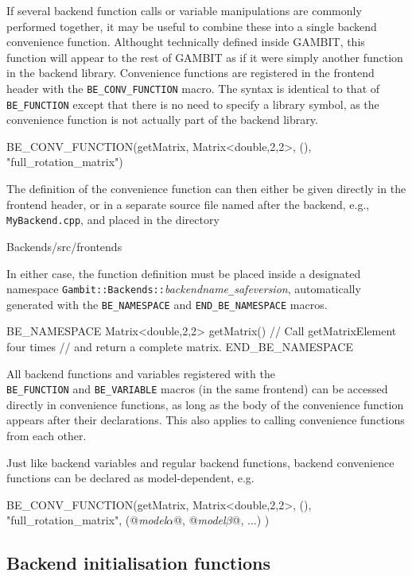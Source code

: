 \documentclass[pdftex,twocolumn,epjc3_preprint,runningheads]{svjour3}
\renewcommand{\_}{\discretionary{\underscore}{}{\underscore}}
\newcommand\cpp[1]{{\lstinline!#1!}}  %
\newcommand\term[1]{{\lstset{style=terminal}\lstinline!#1!\lstset{style=cpp}}}
\newcommand{\metavarf}[1]{\textit{\color{darkgreen}\footnotesize\textrm{#1}}}
\newcommand{\metavar}{\metavarf}
\newcommand{\gambit}{\textsf{GAMBIT}\xspace}
\newcommand{\GB}{\gambit}
\begin{document}
If several backend function calls or variable manipulations are commonly performed together, it may be useful to combine these into a single backend convenience function. Althought technically defined inside \GB, this function will appear to the rest of \GB as if it were simply another function in the backend library. Convenience functions are registered in the frontend header with the \lstinline|BE_CONV_FUNCTION| macro. The syntax is identical to that of \lstinline|BE_FUNCTION| except that there is no need to specify a library symbol, as the convenience function is not actually part of the backend library.
\begin{lstcpp}
BE_CONV_FUNCTION(getMatrix, Matrix<double,2,2>,
 (), "full_rotation_matrix")
\end{lstcpp}
The definition of the convenience function can then either be given directly in the frontend header, or in a separate source file named after the backend, e.g., \mbox{\term{MyBackend.cpp},} and placed in the directory
\begin{lstterm}
Backends/src/frontends
\end{lstterm}
In either case, the function definition must be placed inside a designated namespace \cpp{Gambit::Backends::}\metavar{backend\_name}\cpp{_}\metavar{safe\_version}, automatically generated with the \lstinline|BE_NAMESPACE| and \lstinline|END_BE_NAMESPACE| macros.
\begin{lstcpp}
BE_NAMESPACE
{
  Matrix<double,2,2> getMatrix()
  {
    // Call getMatrixElement four times
    // and return a complete matrix.
  }
}
END_BE_NAMESPACE
\end{lstcpp}
All backend functions and variables registered with the\\ \lstinline|BE_FUNCTION| and \lstinline|BE_VARIABLE| macros (in the same frontend) can be accessed directly in convenience functions, as long as the body of the convenience function appears after their declarations.  This also applies to calling convenience functions from each other.

Just like backend variables and regular backend functions, backend convenience functions can be declared as model-dependent, e.g.
\begin{lstcpp}
BE_CONV_FUNCTION(getMatrix, Matrix<double,2,2>,
 (), "full_rotation_matrix", (@\metavar{model\_$\alpha$}@,
 @\metavar{model\_$\beta$}@, ...) )
\end{lstcpp}

\subsection{Backend initialisation functions}
\label{be_ini_func}
\end{document}
